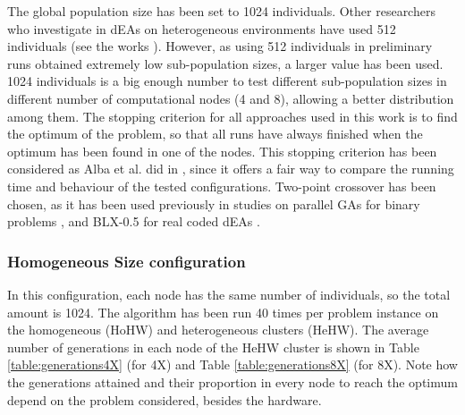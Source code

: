 \documentclass[final,1p,times]{elsarticle}
\begin{document}
The global population size has been set to 1024 individuals. Other researchers who investigate in dEAs on heterogeneous environments have used 512 individuals (see the works \cite{HYDROCM,Dominguez13HydroCM,Salto13Distributed}). However, as using 512 individuals in  preliminary runs obtained extremely low sub-population sizes, a larger value has been used. 1024 individuals is a  big enough number to test different sub-population sizes in different number of computational nodes (4 and 8), allowing a better distribution among them. The stopping criterion for all approaches used in this work is to find the optimum of the problem, so that all runs have always finished when the optimum has been found in one of the nodes. This stopping criterion has been considered as Alba et al. did in \cite{EVALUATIONPARALLEL}, since it offers a fair way to compare the running time and behaviour of the tested configurations. Two-point crossover has been chosen, as it has been used previously in studies on parallel GAs  for binary problems \cite{CantuPazTopologies99}, and BLX-0.5 for real coded dEAs \cite{Robles09ParallelFuzzy}.

\subsubsection{Homogeneous Size configuration}



In this configuration, each node has the same number of individuals, so the total amount is 1024.  The algorithm has been run 40 times per problem instance on the homogeneous (HoHW) and heterogeneous clusters (HeHW).  The average number of generations in each node of the HeHW cluster is shown in Table \ref{table:generations4X} (for 4X) and Table \ref{table:generations8X} (for 8X). Note how the generations attained and their proportion in every node to reach the optimum depend on the problem considered, besides the hardware.
\end{document}
